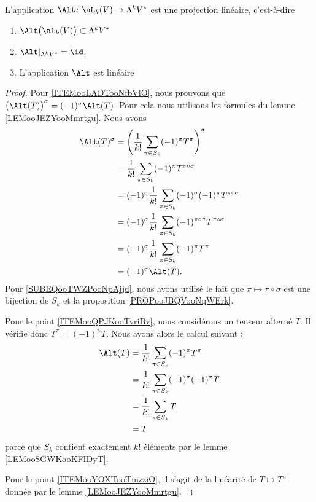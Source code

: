 \begin{lemma}		\label{LEMooWYCAooKoFpRu}
	L'application \(\Alt \colon \aL_k(V)\to \Lambda^kV^*  \) est une projection linéaire, c'est-à-dire
	\begin{enumerate}
		\item\label{ITEMooLADTooNfbVlO} \( \Alt\big( \aL_k(V) \big)\subset \Lambda^kV^*  \)
		\item\label{ITEMooQPJKooTvriBv} \( \Alt|_{\Lambda^kV^*}=\id\).
		\item		\label{ITEMooYOXTooTmzziO}
		      L'application \( \Alt\) est linéaire
	\end{enumerate}
\end{lemma}

\begin{proof}
	Pour \ref{ITEMooLADTooNfbVlO}, nous prouvons que \( \big( \Alt(T) \big)^{\sigma}=(-1)^{\sigma}\Alt(T)\). Pour cela nous utilisons les formules du lemme \ref{LEMooJEZYooMmrtgu}. Nous avons
	\begin{subequations}
		\begin{align}
			\Alt(T)^{\sigma} & = \left( \frac{1}{ k!}\sum_{\pi\in S_k}(-1)^{\pi}T^{\pi} \right)^{\sigma}                 \\
			                 & = \frac{1}{ k!}\sum_{\pi\in S_k}(-1)^{\pi}T^{\pi\circ\sigma}                              \\
			                 & = (-1)^{\sigma}\frac{1}{ k!}\sum_{\pi\in S_k}(-1)^{\sigma}(-1)^{\pi}T^{\pi\circ\sigma}    \\
			                 & = (-1)^{\sigma}\frac{1}{ k!}\sum_{\pi\in S_k}(-1)^{\pi\circ \sigma}T^{\pi\circ\sigma}     \\
			                 & = (-1)^{\sigma}\frac{1}{ k!}\sum_{\pi\in S_k}(-1)^{\pi}T^{\pi}		\label{SUBEQooTWZPooNpAjjd} \\
			                 & =(-1)^{\sigma}\Alt(T).
		\end{align}
	\end{subequations}
	Pour \eqref{SUBEQooTWZPooNpAjjd}, nous avons utilisé le fait que \( \pi\mapsto\pi\circ\sigma\) est une bijection de \( S_k\) et la proposition \ref{PROPooJBQVooNqWErk}.

	Pour le point \ref{ITEMooQPJKooTvriBv}, nous considérons un tenseur alterné \( T\). Il vérifie donc \( T^{\pi}=(-1)^{\pi}T\). Nous avons alors le calcul suivant :
	\begin{subequations}
		\begin{align}
			\Alt(T) & =\frac{1}{ k!}\sum_{\pi\in S_k}(-1)^{\pi}T^{\pi}     \\
			        & =\frac{1}{ k!}\sum_{\pi\in S_k}(-1)^{\pi}(-1)^{\pi}T \\
			        & =\frac{1}{ k!}\sum_{\pi\in S_k}T                     \\
			        & =T
		\end{align}
	\end{subequations}
	parce que \( S_k\) contient exactement \( k!\) éléments par le lemme \ref{LEMooSGWKooKFIDyT}.

	Pour le point \ref{ITEMooYOXTooTmzziO}, il s'agit de la linéarité de \( T\mapsto T^{\pi}\) donnée par le lemme \ref{LEMooJEZYooMmrtgu}.
\end{proof}

